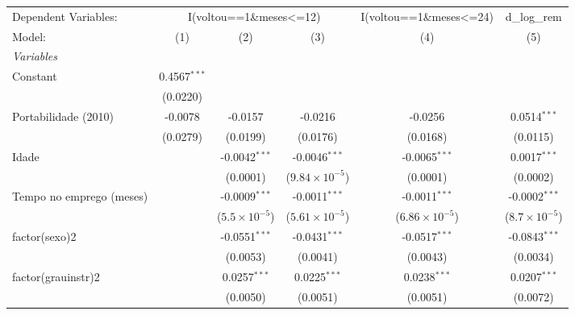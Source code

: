 
\begingroup
\centering
\begin{tabular}{lccccc}
   \tabularnewline \midrule \midrule
   Dependent Variables: & \multicolumn{3}{c}{I(voltou==1\&meses<=12)} & I(voltou==1\&meses<=24) & d\_log\_rem\\
   Model:                   & (1)                   & (2)                    & (3)                     & (4)                     & (5)\\  
   \midrule
   \emph{Variables}\\
   Constant                 & 0.4567$^{***}$        &                        &                         &                         &   \\   
                            & (0.0220)              &                        &                         &                         &   \\   
   Portabilidade (2010)     & -0.0078               & -0.0157                & -0.0216                 & -0.0256                 & 0.0514$^{***}$\\   
                            & (0.0279)              & (0.0199)               & (0.0176)                & (0.0168)                & (0.0115)\\   
   Idade                    &                       & -0.0042$^{***}$        & -0.0046$^{***}$         & -0.0065$^{***}$         & 0.0017$^{***}$\\   
                            &                       & (0.0001)               & ($9.84\times 10^{-5}$)  & (0.0001)                & (0.0002)\\   
   Tempo no emprego (meses) &                       & -0.0009$^{***}$        & -0.0011$^{***}$         & -0.0011$^{***}$         & -0.0002$^{***}$\\   
                            &                       & ($5.5\times 10^{-5}$)  & ($5.61\times 10^{-5}$)  & ($6.86\times 10^{-5}$)  & ($8.7\times 10^{-5}$)\\    
   factor(sexo)2            &                       & -0.0551$^{***}$        & -0.0431$^{***}$         & -0.0517$^{***}$         & -0.0843$^{***}$\\   
                            &                       & (0.0053)               & (0.0041)                & (0.0043)                & (0.0034)\\   
   factor(grauinstr)2       &                       & 0.0257$^{***}$         & 0.0225$^{***}$          & 0.0238$^{***}$          & 0.0207$^{***}$\\   
                            &                       & (0.0050)               & (0.0051)                & (0.0051)                & (0.0072)\\   

\end{tabular}
